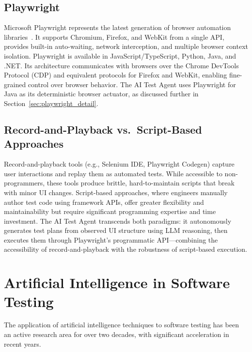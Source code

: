 \subsection{Playwright}
\label{subsec:playwright_overview}

Microsoft Playwright represents the latest generation of browser
automation libraries~\cite{playwright2024}. It supports Chromium,
Firefox, and WebKit from a single API, provides built-in auto-waiting,
network interception, and multiple browser context isolation. Playwright
is available in JavaScript/TypeScript, Python, Java, and .NET. Its
architecture communicates with browsers over the Chrome DevTools Protocol
(CDP) and equivalent protocols for Firefox and WebKit, enabling
fine-grained control over browser behavior. The AI Test Agent uses
Playwright for Java as its deterministic browser actuator, as discussed
further in Section~\ref{sec:playwright_detail}.

\subsection{Record-and-Playback vs.\ Script-Based Approaches}
\label{subsec:record_playback}

Record-and-playback tools (e.g., Selenium IDE, Playwright Codegen)
capture user interactions and replay them as automated tests. While
accessible to non-programmers, these tools produce brittle, hard-to-maintain
scripts that break with minor UI changes. Script-based approaches, where
engineers manually author test code using framework APIs, offer greater
flexibility and maintainability but require significant programming
expertise and time investment. The AI Test Agent transcends both paradigms:
it autonomously generates test plans from observed UI structure using LLM
reasoning, then executes them through Playwright's programmatic API---combining
the accessibility of record-and-playback with the robustness of
script-based execution.

\section{Artificial Intelligence in Software Testing}
\label{sec:ai_testing}

The application of artificial intelligence techniques to software testing
has been an active research area for over two decades, with significant
acceleration in recent years.


